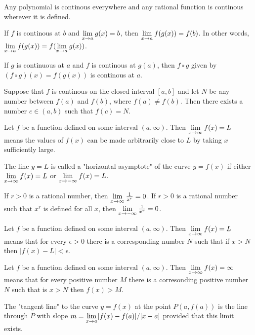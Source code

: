 \documentclass[a4paper,8pt]{article}
\begin{document}
\begin{outline}
    Any polynomial is continous everywhere and any rational function is continous wherever it is defined.

    If \(f\) is continous at \(b\) and \(\lim\limits_{x\rightarrow a^{}} g(x) = b\), then \(\lim\limits_{x\rightarrow a^{}} f(g(x)) = f(b)\).
    In other words, \(\lim\limits_{x\rightarrow a^{}} f(g(x)) = f(\lim\limits_{x\rightarrow a^{}} g(x))\).

    If \(g\) is continuous at \(a\) and \(f\) is continous at \(g(a)\), then \(f \circ g\) given by
    \((f \circ g)(x) = f(g(x))\) is continous at \(a\).

    Suppose that \(f\) is continous on the closed interval \([a, b]\) and let \(N\) be any number between
    \(f(a)\) and \(f(b)\), where \(f(a) \neq f(b)\). Then there exists a number \(c \in (a, b)\) such that
    \(f(c) = N\).

    Let \(f\) be a function defined on some interval \((a, \infty)\). Then \(\lim\limits_{x\rightarrow \infty^{}} f(x) = L\)
    means the values of \(f(x)\) can be made arbitrarily close to \(L\) by taking \(x\) sufficiently large.

    The line \(y = L\) is called a "horizontal asymptote" of the curve \(y = f(x)\) if either \(\lim\limits_{x\rightarrow \infty^{}}
    f(x)=L\) or \(\lim\limits_{x\rightarrow -\infty^{}} f(x) = L\).

    If \(r > 0\) is a rational number, then \(\lim\limits_{x\rightarrow \infty^{}} \frac{1}{x^r} = 0\). If \(r > 0\) is
    a rational number such that \(x^r\) is defined for all \(x\), then \(\lim\limits_{x\rightarrow -\infty^{}} \frac{1}{x^r} = 0\).

    Let \(f\) be a function defined on some interval \((a, \infty)\). Then \(\lim\limits_{x\rightarrow \infty^{}} f(x) = L\) means
    that for every \(\epsilon > 0\) there is a corresponding number \(N\) such that if \(x > N\) then \(|f(x)-L|
    < \epsilon\).

    Let \(f\) be a function defined on some interval \((a, \infty)\). Then \(\lim\limits_{x\rightarrow \infty^{}}f(x)=\infty\) means
    that for every positive number \(M\) there is a corresonding positive number \(N\) such that is \(x > N\) then
    \(f(x) > M\).

    The "tangent line" to the curve \(y = f(x)\) at the point \(P(a, f(a))\) is the line through \(P\) with slope
    \(m = \lim\limits_{x\rightarrow a^{}} [f(x)-f(a)]/[x-a]\) provided that this limit exists.


\end{outline}
\end{document}
